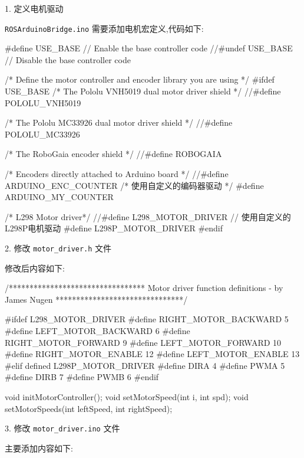 \documentclass[openany, fontset=windowsold]{ctexbook}
\theoremstyle{kaiti}
\theoremstyle{normal}
\begin{document}
1. 定义电机驱动

\verb|ROSArduinoBridge.ino| 需要添加电机宏定义,代码如下:

\begin{cpp}
  #define USE_BASE      // Enable the base controller code
  //#undef USE_BASE     // Disable the base controller code

  /* Define the motor controller and encoder library you are using */
  #ifdef USE_BASE
    /* The Pololu VNH5019 dual motor driver shield */
    //#define POLOLU_VNH5019

    /* The Pololu MC33926 dual motor driver shield */
    //#define POLOLU_MC33926

    /* The RoboGaia encoder shield */
    //#define ROBOGAIA

    /* Encoders directly attached to Arduino board */
    //#define ARDUINO_ENC_COUNTER
    /* 使用自定义的编码器驱动 */
    #define ARDUINO_MY_COUNTER

    /* L298 Motor driver*/
    //#define L298_MOTOR_DRIVER
    // 使用自定义的L298P电机驱动
    #define L298P_MOTOR_DRIVER
  #endif
\end{cpp}

2. 修改 \verb|motor_driver.h| 文件

修改后内容如下:

\begin{cpp}
  /*********************************
    Motor driver function definitions - by James Nugen
    *******************************/

  #ifdef L298_MOTOR_DRIVER
    #define RIGHT_MOTOR_BACKWARD 5
    #define LEFT_MOTOR_BACKWARD  6
    #define RIGHT_MOTOR_FORWARD  9
    #define LEFT_MOTOR_FORWARD   10
    #define RIGHT_MOTOR_ENABLE 12
    #define LEFT_MOTOR_ENABLE 13
  #elif defined L298P_MOTOR_DRIVER
    #define DIRA 4
    #define PWMA 5
    #define DIRB 7
    #define PWMB 6
  #endif

  void initMotorController();
  void setMotorSpeed(int i, int spd);
  void setMotorSpeeds(int leftSpeed, int rightSpeed);
\end{cpp}

3. 修改 \verb|motor_driver.ino| 文件

主要添加内容如下:
\end{document}

